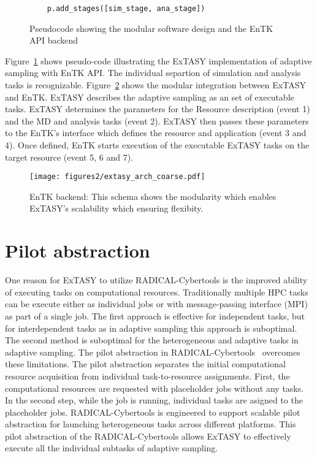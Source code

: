 {\begin{figure}[h!]
\begin{lstlisting}
    p.add_stages([sim_stage, ana_stage])
    \end{lstlisting}
    \caption{Pseudocode showing the modular software design and the EnTK API backend}\label{extasy_snippet}
\end{figure}


Figure~\ref{extasy_snippet} shows pseudo-code illustrating the ExTASY implementation of adaptive sampling with EnTK API. The individual separtion of simulation and analysis tasks is recognizable. Figure~\ref{fig:extasy_arch} shows the modular integration between ExTASY and EnTK. ExTASY describes the adaptive sampling as an set of executable tasks. ExTASY determines the parameters for the Resource description (event 1) and the MD and analysis tasks (event 2). ExTASY then passes these parameters to the EnTK's interface which defines the resource and application (event 3 and 4). Once defined, EnTK starts execution of the executable ExTASY tasks on the target resource (event 5, 6 and 7). 

\begin{figure}[H]
 \centering
  \texttt{[image: figures2/extasy\_arch\_coarse.pdf]}
  \caption{EnTK backend: This schema shows the modularity which enables ExTASY's scalability which ensuring flexibity.  
  }\label{fig:extasy_arch}
\end{figure}


\section{Pilot abstraction} 
One reason for ExTASY to utilize RADICAL-Cybertools is the improved ability of executing tasks on computational resources. Traditionally multiple HPC tasks can be execute either as individual jobs or with message-passing interface (MPI) as part of a single job. The first approach is effective for independent tasks, but for interdependent tasks as in adaptive sampling this approach is suboptimal. The second method is suboptimal for the heterogeneous and adaptive tasks in adaptive sampling. The pilot abstraction in RADICAL-Cybertools~\cite{turilli2018comprehensive} overcomes these limitations.  The pilot abstraction separates the initial computational resource acquisition from individual task-to-resource assignments. First, the computational resources are requested with placeholder jobs without any tasks. In the second step, while the job is running, individual tasks are asigned to the placeholder jobs. RADICAL-Cybertools is engineered to support scalable pilot abstraction for launching heterogeneous tasks across different platforms. This pilot abstraction of the RADICAL-Cybertools allows ExTASY to effectively execute all the individual subtasks of adaptive sampling.  

}
